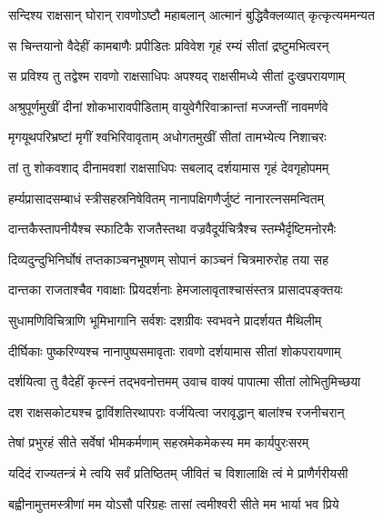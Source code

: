 
\twolineshloka
{सन्दिश्य राक्षसान् घोरान् रावणोऽष्टौ महाबलान्}
{आत्मानं बुद्धिवैक्लव्यात् कृत्कृत्यममन्यत} %

\twolineshloka
{स चिन्तयानो वैदेहीं कामबाणैः प्रपीडितः}
{प्रविवेश गृहं रम्यं सीतां द्रष्टुमभित्वरन्} %

\twolineshloka
{स प्रविश्य तु तद्वेश्म रावणो राक्षसाधिपः}
{अपश्यद् राक्षसीमध्ये सीतां दुःखपरायणाम्} %

\twolineshloka
{अश्रुपूर्णमुखीं दीनां शोकभारावपीडिताम्}
{वायुवेगैरिवाक्रान्तां मज्जन्तीं नावमर्णवे} %

\twolineshloka
{मृगयूथपरिभ्रष्टां मृगीं श्वभिरिवावृताम्}
{अधोगतमुखीं सीतां तामभ्येत्य निशाचरः} %

\twolineshloka
{तां तु शोकवशाद् दीनामवशां राक्षसाधिपः}
{सबलाद् दर्शयामास गृहं देवगृहोपमम्} %

\twolineshloka
{हर्म्यप्रासादसम्बाधं स्त्रीसहस्रनिषेवितम्}
{नानापक्षिगणैर्जुष्टं नानारत्नसमन्वितम्} %

\twolineshloka
{दान्तकैस्तापनीयैश्च स्फाटिकै राजतैस्तथा}
{वज्रवैदूर्यचित्रैश्च स्तम्भैर्दृष्टिमनोरमैः} %

\twolineshloka
{दिव्यदुन्दुभिनिर्घोषं तप्तकाञ्चनभूषणम्}
{सोपानं काञ्चनं चित्रमारुरोह तया सह} %

\twolineshloka
{दान्तका राजताश्चैव गवाक्षाः प्रियदर्शनाः}
{हेमजालावृताश्चासंस्तत्र प्रासादपङ्क्तयः} %

\twolineshloka
{सुधामणिविचित्राणि भूमिभागानि सर्वशः}
{दशग्रीवः स्वभवने प्रादर्शयत मैथिलीम्} %

\twolineshloka
{दीर्घिकाः पुष्करिण्यश्च नानापुष्पसमावृताः}
{रावणो दर्शयामास सीतां शोकपरायणाम्} %

\twolineshloka
{दर्शयित्वा तु वैदेहीं कृत्स्नं तद्भवनोत्तमम्}
{उवाच वाक्यं पापात्मा सीतां लोभितुमिच्छया} %

\twolineshloka
{दश राक्षसकोट्यश्च द्वाविंशतिरथापराः}
{वर्जयित्वा जरावृद्धान् बालांश्च रजनीचरान्} %

\twolineshloka
{तेषां प्रभुरहं सीते सर्वेषां भीमकर्मणाम्}
{सहस्रमेकमेकस्य मम कार्यपुरःसरम्} %

\twolineshloka
{यदिदं राज्यतन्त्रं मे त्वयि सर्वं प्रतिष्ठितम्}
{जीवितं च विशालाक्षि त्वं मे प्राणैर्गरीयसी} %

\twolineshloka
{बह्वीनामुत्तमस्त्रीणां मम योऽसौ परिग्रहः}
{तासां त्वमीश्वरी सीते मम भार्या भव प्रिये} %

